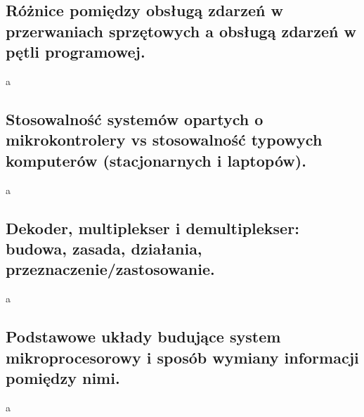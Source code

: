 \documentclass[a4paper,12pt,oneside]{book}
\begin{document}
			\subsection{\color{red}Różnice pomiędzy obsługą zdarzeń w przerwaniach sprzętowych a obsługą zdarzeń w pętli programowej.}
				a
			\newpage\subsection{\color{red}Stosowalność systemów opartych o mikrokontrolery vs stosowalność typowych komputerów (stacjonarnych i laptopów).}
				a
			\newpage\subsection{\color{red}Dekoder, multiplekser i demultiplekser: budowa, zasada, działania, przeznaczenie/zastosowanie.}
				a
			\newpage\subsection{\color{red}Podstawowe układy budujące system mikroprocesorowy i sposób wymiany informacji pomiędzy nimi.}
				a
\end{document}
